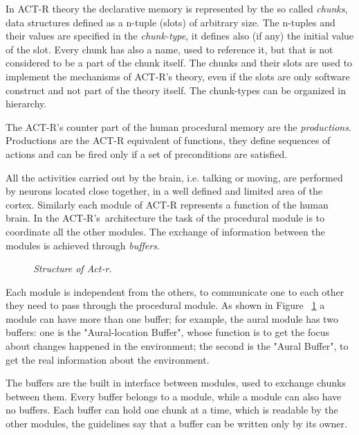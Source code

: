 	In \mbox{ACT-R} theory the declarative memory is represented by the so called \emph{chunks}, data structures defined as a n-tuple (slots) of arbitrary size. The n-tuples and their values are specified in the \emph{chunk-type}, it defines also (if any) the initial value of the slot. Every chunk has also a name, used to reference it, but that is not considered to be a part of the chunk itself. The chunks and their slots are used to implement the mechanisms of \mbox{ACT-R's} theory, even if the slots are only software construct and not part of the theory itself. The chunk-types can be organized in hierarchy.

	The \mbox{ACT-R's} counter part of the human procedural memory are the \emph{productions}. Productions are the \mbox{ACT-R} equivalent of functions, they define sequences of actions and can be fired only if a set of preconditions are satisfied.  

	All the activities carried out by the brain, i.e. talking or moving, are performed by neurons located close together, in a well defined and limited area of the cortex. Similarly each module of \mbox{ACT-R} represents a function of the human brain. In the \mbox{ACT-R's architecture} the task of the procedural module is to coordinate all the other modules. The exchange of information between the modules is achieved through \emph{buffers}.

	\begin{figure}[h]
	\begin{center} 
	\end{center} 
	\caption{\textit{Structure of Act-r.}}  
	\label{fig:modulesActr}
	\end{figure}
	
	Each module is independent from the others, to communicate one to each other they need to pass through the procedural module. As shown in Figure  ~\ref{fig:modulesActr} a module can have more than one buffer; for example, the aural module has two buffers: one is the "Aural-location Buffer", whose function is to get the focus about changes happened in the environment; the second is the "Aural Buffer", to get the real information about the environment.

	The buffers are the built in interface between modules, used to exchange chunks between them. Every buffer belongs to a module, while a module can also have no buffers. Each buffer can hold one chunk at a time, which is readable by the other modules, the guidelines say that a buffer can be written only by its owner. 

